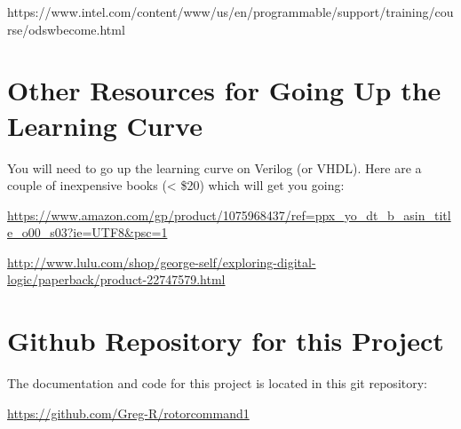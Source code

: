 https://www.intel.com/content/www/us/en/programmable/support/training/course/odswbecome.html

\section{Other Resources for Going Up the Learning Curve}

You will need to go up the learning curve on Verilog (or VHDL).
Here are a couple of inexpensive books (< \$20) which will get you going:

\url{https://www.amazon.com/gp/product/1075968437/ref=ppx_yo_dt_b_asin_title_o00_s03?ie=UTF8&psc=1}

\url{http://www.lulu.com/shop/george-self/exploring-digital-logic/paperback/product-22747579.html}

\section{Github Repository for this Project}

The documentation and code for this project is located in this git repository:

\url{https://github.com/Greg-R/rotorcommand1}